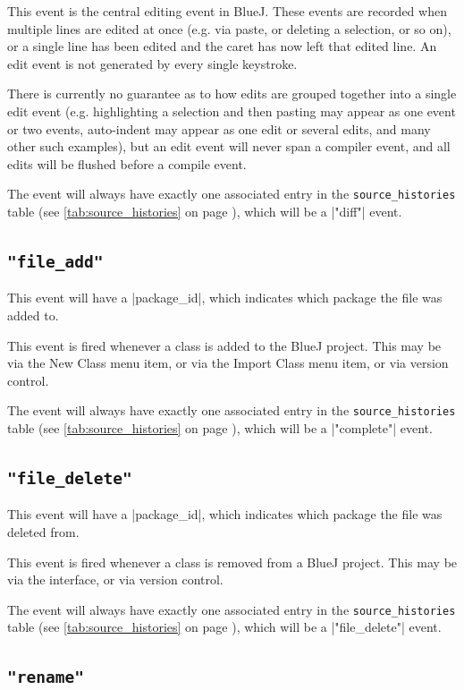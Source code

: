 \documentclass{report}
\newcommand{\myref}[1]{\autoref{#1} on page \pageref*{#1}}
\newcommand{\tabref}[1]{\lstinline|#1| table (see \myref{tab:#1})}
\begin{document}
This event is the central editing event in BlueJ.  These events are recorded
when multiple lines are edited at once (e.g. via paste, or deleting a
selection, or so on), or a single line has been edited and the caret
has now left that edited line.  An edit event is not generated by every single
keystroke.

There is currently no guarantee as to how edits are grouped together into a single edit
event (e.g. highlighting a selection and then pasting may appear as one event
or two events, auto-indent may appear as one edit or several edits, and many
other such examples), but an edit event will never span a compiler event, and
all edits will be flushed before a compile event.

The event will always have exactly one associated entry in the
\tabref{source_histories}, which will be a |"diff"| event.

\subsection{\lstinline!"file_add"!}

This event will have a |package_id|, which indicates which package the file
was added to.

This event is fired whenever a class is added to the BlueJ project.  This may
be via the New Class menu item, or via the Import Class menu item, or via
version control.

The event will always have exactly one associated entry in the
\tabref{source_histories}, which will be a |"complete"| event.

\subsection{\lstinline!"file_delete"!}

This event will have a |package_id|, which indicates which package the file
was deleted from.

This event is fired whenever a class is removed from a BlueJ project.  This
may be via the interface, or via version control.

The event will always have exactly one associated entry in the
\tabref{source_histories}, which will be a |"file_delete"| event.

\subsection{\lstinline!"rename"!}
\end{document}
